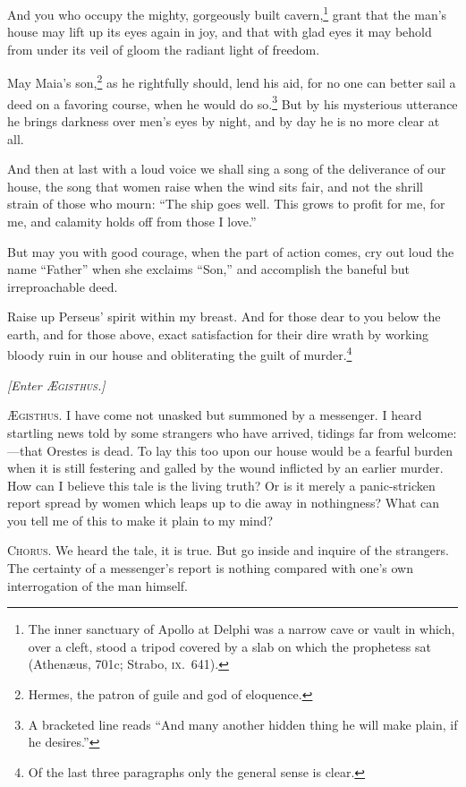 \documentclass[12pt]{article}
\begin{document}
And you who occupy the mighty, gorgeously built cavern,\footnote{The inner sanctuary of Apollo at Delphi was a narrow cave or vault in which, over a cleft, stood a tripod covered by a slab on which the prophetess sat (Athen{\ae}us, 701c; Strabo, \textsc{ix}.~641).} grant that the man's house may lift up its eyes again in joy, and that with glad eyes it may behold from under its veil of gloom the radiant light of freedom.

May Maia's son,\footnote{Hermes, the patron of guile and god of eloquence.} as he rightfully should, lend his aid, for no one can better sail a deed on a favoring course, when he would do so.\footnote{A bracketed line reads ``And many another hidden thing he will make plain, if he desires.''} But by his mysterious utterance he brings darkness over men's eyes by night, and by day he is no more clear at all.

And then at last with a loud voice we shall sing a song of the deliverance of our house, the song that women raise when the wind sits fair, and not the shrill strain of those who mourn: ``The ship goes well. This grows to profit for me, for me, and calamity holds off from those I love.''

But may you with good courage, when the part of action comes, cry out loud the name ``Father'' when she exclaims ``Son,'' and accomplish the baneful but irreproachable deed.

Raise up Perseus' spirit within my breast. And for those dear to you below the earth, and for those above, exact satisfaction for their dire wrath by working bloody ruin in our house and obliterating the guilt of murder.\footnote{Of the last three paragraphs only the general sense is clear.}

\begin{center}
\textit{[Enter \textsc{{\AE}gisthus}.]}
\end{center}

\textsc{{\AE}gisthus.} I have come not unasked but summoned by a messenger. I heard startling news told by some strangers who have arrived, tidings far from welcome:---that Orestes is dead. To lay this too upon our house would be a fearful burden when it is still festering and galled by the wound inflicted by an earlier murder. How can I believe this tale is the living truth? Or is it merely a panic-stricken report spread by women which leaps up to die away in nothingness? What can you tell me of this to make it plain to my mind?

\textsc{Chorus.} We heard the tale, it is true. But go inside and inquire of the strangers. The certainty of a messenger's report is nothing compared with one's own interrogation of the man himself.
\end{document}
